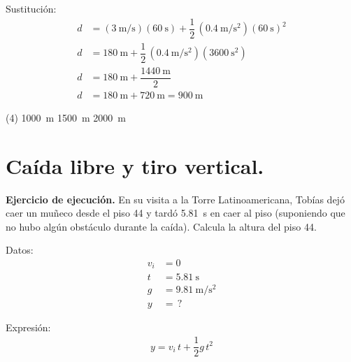 \documentclass[12pt, letter]{exam}
\begin{document}
\begin{questions}
    Sustitución:
    \begin{align*}
    d &= \left( \SI[per-mode=fraction]{3}{\meter\per\second} \right) \left( \SI{60}{\second} \right) + \dfrac{1}{2} \, \left( \SI[per-mode=fraction]{0.4}{\meter\per\square\second} \right) \left( \SI{60}{\second} \right)^{2} \\[0.5em]
    d &= \SI{180}{\meter} + \dfrac{1}{2} \, \left( \SI[per-mode=fraction]{0.4}{\meter\per\square\second} \right) \left( \SI{3600}{\square\second} \right) \\[0.5em]
    d &= \SI{180}{\meter} + \dfrac{\SI{1440}{\meter}}{2} \\[0.5em]
    d &= \SI{180}{\meter} + \SI{720}{\meter} = \SI{900}{\meter}
    \end{align*}
    \begin{tasks}(4)
        \task {}
        \task \SI{1000}{\meter}
        \task \SI{1500}{\meter}
        \task \SI{2000}{\meter}
    \end{tasks}

    \newpage

    \section{Caída libre y tiro vertical.}

    \setcounter{question}{8} \question \label{Ejercicio_05} \textbf{Ejercicio de ejecución. } En su visita a la Torre Latinoamericana, Tobías dejó caer un muñeco desde el piso \num{44} y tardó \SI{5.81}{\second} en caer al piso (suponiendo que no hubo algún obstáculo durante la caída). Calcula la altura del piso \num{44}.

    \begin{minipage}[t]{0.35\linewidth}
    Datos: 
    \begin{align*}
    v_{i} &= 0 \\
    t &= \SI{5.81}{\second} \\
    g &= \SI{9.81}{\meter\per\square\second} \\
    y &= \, ?
    \end{align*}
    \end{minipage}
    \hspace{1cm}
    \begin{minipage}[t]{0.4\linewidth}
    Expresión:
    \begin{align*}
    y = v_{i} \, t + \dfrac{1}{2} g \, t^{2}
    \end{align*}
    \end{minipage}


\end{questions}
\end{document}
